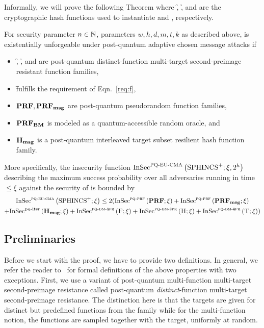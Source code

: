 Informally, we will prove the following Theorem where \f, \h, and \tfunc are the
cryptographic hash functions used to instantiate \sphincsF and \sphincsH, \sphincsT respectively.

\begin{theorem}\label{thm:spx}
For security parameter $n \in \mathbb{N}$, parameters $w, h, d, m, t, k$ as described
above, \spx is existentially unforgeable under post-quantum adaptive chosen
message attacks if
\begin{itemize}
	\item \f, \h, and \tfunc are post-quantum distinct-function multi-target second-preimage resistant function families,
	\item \f fulfills the requirement of Eqn.~\ref{req:f},
	\item $\mathbf{PRF}, \mathbf{PRF_{msg}}$ are post-quantum pseudorandom function families,
	\item $\mathbf{PRF_{BM}}$ is modeled as a quantum-accessible random oracle, and
	\item $\mathbf{H_{msg}}$ is a post-quantum interleaved target subset resilient hash function family.
\end{itemize}
More specifically, the insecurity function
${\mathrm{InSec}}^{{\mathsf{\textsc{{PQ\text{-}EU\text{-}CMA}}}}}\left( {{\textrm{SPHINCS}^+}}; {\xi,2^h} \right) $ describing the maximum success
probability over all adversaries running in time $\leq
\xi$ against the \pqeucma security of \spx is bounded by
\begin{multline}\label{eqn:exactmin}
 {\mathrm{InSec}}^{{\mathsf{\textsc{{pq\text{-}eu\text{-}cma}}}}}\left( {{\textrm{SPHINCS}^+}}; {\xi} \right)  \leq 2({\mathrm{InSec}}^{{\mathsf{\textsc{pq-prf}}}}\left( {\mathbf{PRF}}; {\xi} \right) +{\mathrm{InSec}}^{{\mathsf{\textsc{pq-prf}}}}\left( {\mathbf{PRF_{msg}}}; {\xi} \right)  \\
 + {\mathrm{InSec}}^{{\text{pq-itsr}}}\left( {\mathbf{H_{msg}}}; {\xi} \right) + {\mathrm{InSec}}^{{\mathsf{\textsc{pq-dm-spr}}}}\left( {\textsc{F}}; {\xi} \right) + {\mathrm{InSec}}^{{\mathsf{\textsc{pq-dm-spr}}}}\left( {\textsc{H}}; {\xi} \right) + {\mathrm{InSec}}^{{\mathsf{\textsc{pq-dm-spr}}}}\left( {\textsc{T}}; {\xi} \right) )
 \end{multline}
\end{theorem}

\subsection{Preliminaries}
Before we start with the proof, we have to provide two definitions. In general,
we refer the reader to~\cite{Huelsing2016} for formal definitions of the above
properties with two exceptions. First, we use a variant of
post-quantum multi-function multi-target second-preimage resistance called
post-quantum \emph{distinct}-function multi-target second-preimage resistance.
The distinction here is that the targets are given for distinct but
predefined functions from the family while for the multi-function notion,
the functions are sampled together with the target, uniformly at random.

